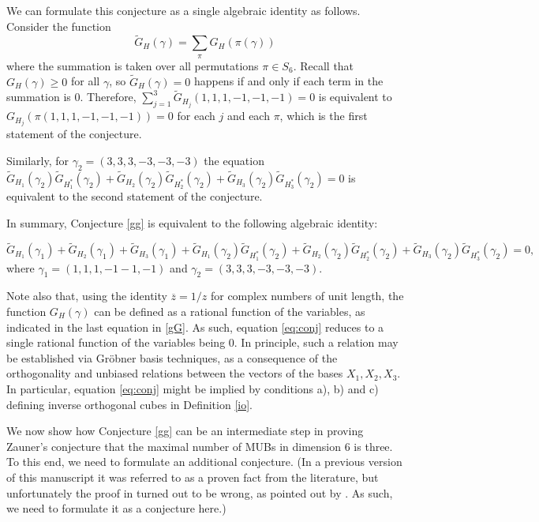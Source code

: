 \documentclass[12pt]{amsart}
\numberwithin{equation}{section}
\theoremstyle{definition}
\theoremstyle{remark}
\theoremstyle{remark}
\begin{document}
We can formulate this conjecture as a single algebraic identity as follows. Consider the function
\begin{equation}\label{Gbar}
\tilde{G}_H(\gamma)=\sum_\pi G_H(\pi (\gamma))
\end{equation}
where the summation is taken over all permutations $\pi\in S_6$. Recall that $G_H(\gamma)\ge 0$ for all $\gamma$, so $\tilde{G}_H(\gamma)=0$ happens if and only if each term in the summation is 0. Therefore, $\sum_{j=1}^3\tilde{G}_{H_j}(1,1,1,-1,-1,-1)=0$ is equivalent to $G_{H_j}(\pi(1,1,1,-1,-1,-1))=0$ for each $j$ and each $\pi$, which is the first statement of the conjecture.

\medskip

Similarly, for  $\gamma_2=(3,3,3,-3,-3,-3)$ the equation $\tilde{G}_{H_1}(\gamma_2)\tilde{G}_{H^\ast_1}(\gamma_2)+
\tilde{G}_{H_2}(\gamma_2)\tilde{G}_{H^\ast_2}(\gamma_2)+\tilde{G}_{H_3}(\gamma_2)\tilde{G}_{H^\ast_3}(\gamma_2)=0$ is equivalent to the second statement of the conjecture. 

\medskip

In summary, Conjecture \ref{gg} is equivalent to the following algebraic identity: 

\begin{equation}\label{eq:conj}
\tilde{G}_{H_1}(\gamma_1)+\tilde{G}_{H_2}(\gamma_1)+\tilde{G}_{H_3}(\gamma_1)+\tilde{G}_{H_1}(\gamma_2)\tilde{G}_{H^\ast_1}(\gamma_2)+
\tilde{G}_{H_2}(\gamma_2)\tilde{G}_{H^\ast_2}(\gamma_2)+\tilde{G}_{H_3}(\gamma_2)\tilde{G}_{H^\ast_3}(\gamma_2)=0,
\end{equation}
where $\gamma_1=(1,1,1,-1-1,-1)$ and $\gamma_2=(3,3,3,-3,-3,-3)$. 

\medskip

Note also that, using the identity $\overline{z}=1/z$ for complex numbers of unit length, the function ${G}_H(\gamma)$ can be defined as a rational function of the variables, as indicated in the last equation in \eqref{gG}. As such, equation \eqref{eq:conj} reduces to a single rational function of the variables being 0. In principle, such a relation may be established via Gr\"obner basis techniques, as a consequence of the orthogonality and unbiased relations between the vectors of the bases $X_1, X_2, X_3$.  In particular, equation \eqref{eq:conj} might be implied by conditions a), b) and c) defining inverse orthogonal cubes in Definition \ref{io}.

\medskip

We now show how 
Conjecture \ref{gg} can be an intermediate step in proving Zauner's conjecture that the maximal number of MUBs in dimension 6 is three. To this end, we need to formulate an additional conjecture. (In a previous version of this manuscript it was referred to as a proven fact from the literature, but unfortunately the proof in \cite{chen} turned out to be wrong, as pointed out by \cite{weig}. As such, we need to formulate it as a conjecture here.)
\end{document}
